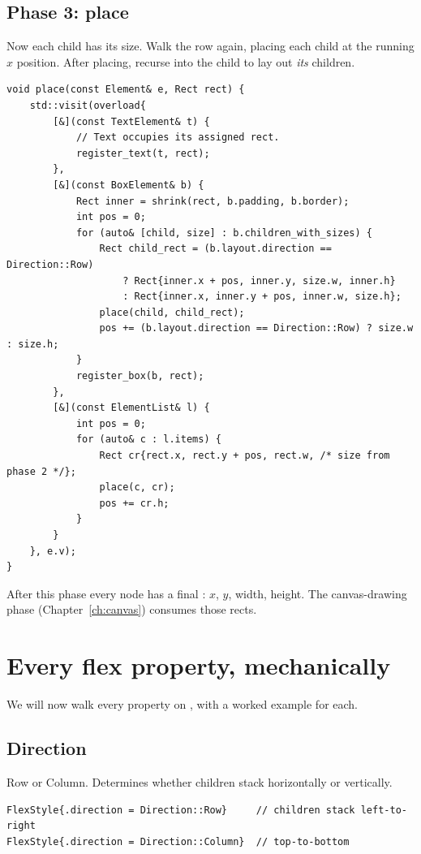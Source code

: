\subsection*{Phase 3: place}

Now each child has its size. Walk the row again, placing each
child at the running $x$ position. After placing, recurse into
the child to lay out \emph{its} children.

\begin{lstlisting}
void place(const Element& e, Rect rect) {
    std::visit(overload{
        [&](const TextElement& t) {
            // Text occupies its assigned rect.
            register_text(t, rect);
        },
        [&](const BoxElement& b) {
            Rect inner = shrink(rect, b.padding, b.border);
            int pos = 0;
            for (auto& [child, size] : b.children_with_sizes) {
                Rect child_rect = (b.layout.direction == Direction::Row)
                    ? Rect{inner.x + pos, inner.y, size.w, inner.h}
                    : Rect{inner.x, inner.y + pos, inner.w, size.h};
                place(child, child_rect);
                pos += (b.layout.direction == Direction::Row) ? size.w : size.h;
            }
            register_box(b, rect);
        },
        [&](const ElementList& l) {
            int pos = 0;
            for (auto& c : l.items) {
                Rect cr{rect.x, rect.y + pos, rect.w, /* size from phase 2 */};
                place(c, cr);
                pos += cr.h;
            }
        }
    }, e.v);
}
\end{lstlisting}

After this phase every node has a final : $x$, $y$,
width, height. The canvas-drawing phase (Chapter~\ref{ch:canvas})
consumes those rects.

\section{Every flex property, mechanically}

We will now walk every property on , with a
worked example for each.

\subsection*{Direction}

Row or Column. Determines whether children stack horizontally or
vertically.

\begin{lstlisting}
FlexStyle{.direction = Direction::Row}     // children stack left-to-right
FlexStyle{.direction = Direction::Column}  // top-to-bottom
\end{lstlisting}

